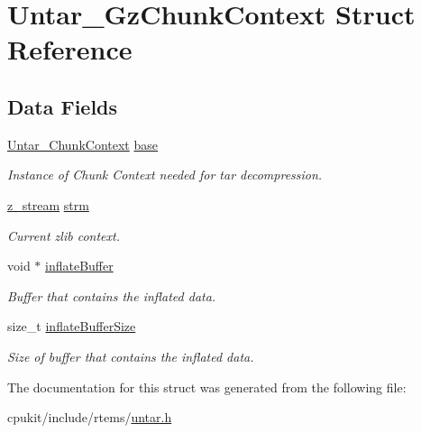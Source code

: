 \hypertarget{structUntar__GzChunkContext}{}\section{Untar\+\_\+\+Gz\+Chunk\+Context Struct Reference}
\label{structUntar__GzChunkContext}
\subsection*{Data Fields}
\begin{DoxyCompactItemize}
\item 
\mbox{\label{structUntar__GzChunkContext_a74f4fda6d48a978b9ab660ebe3c5ab68}} 
\mbox{\hyperlink{structUntar__ChunkContext}{Untar\+\_\+\+Chunk\+Context}} \mbox{\hyperlink{structUntar__GzChunkContext_a74f4fda6d48a978b9ab660ebe3c5ab68}{base}}
\begin{DoxyCompactList}\small\item\em Instance of Chunk Context needed for tar decompression. \end{DoxyCompactList}\item 
\mbox{\label{structUntar__GzChunkContext_abe493daf8a883941c0e73a06b9493339}} 
\mbox{\hyperlink{structz__stream__s}{z\+\_\+stream}} \mbox{\hyperlink{structUntar__GzChunkContext_abe493daf8a883941c0e73a06b9493339}{strm}}
\begin{DoxyCompactList}\small\item\em Current zlib context. \end{DoxyCompactList}\item 
\mbox{\label{structUntar__GzChunkContext_a4364c869f5ca38597dd8663bcc81c83e}} 
void $\ast$ \mbox{\hyperlink{structUntar__GzChunkContext_a4364c869f5ca38597dd8663bcc81c83e}{inflate\+Buffer}}
\begin{DoxyCompactList}\small\item\em Buffer that contains the inflated data. \end{DoxyCompactList}\item 
\mbox{\label{structUntar__GzChunkContext_a9abfa79efd39570302d893817a7eafc5}} 
size\+\_\+t \mbox{\hyperlink{structUntar__GzChunkContext_a9abfa79efd39570302d893817a7eafc5}{inflate\+Buffer\+Size}}
\begin{DoxyCompactList}\small\item\em Size of buffer that contains the inflated data. \end{DoxyCompactList}\end{DoxyCompactItemize}


The documentation for this struct was generated from the following file\+:\begin{DoxyCompactItemize}
\item 
cpukit/include/rtems/\mbox{\hyperlink{untar_8h}{untar.\+h}}\end{DoxyCompactItemize}
